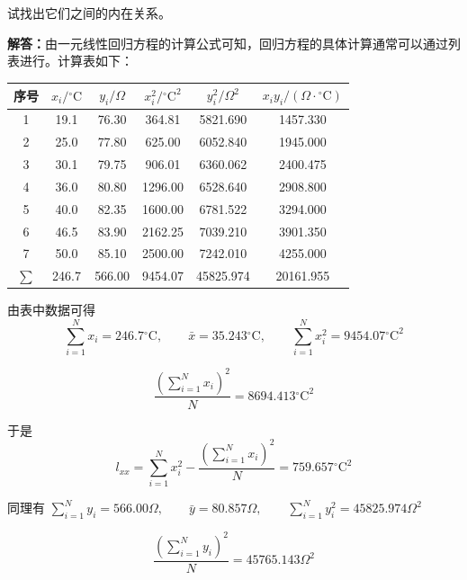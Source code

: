 \documentclass[UTF8,zihao=-4]{ctexart}
\newcommand{\jieda}{\noindent\textbf{解答：}}
\begin{document}
试找出它们之间的内在关系。

\jieda 由一元线性回归方程的计算公式可知，回归方程的具体计算通常可以通过列表进行。计算表如下：

\begin{center}
\small
\setlength{\tabcolsep}{4.5pt}
\begin{tabular}{c|c|c|c|c|c}
\toprule
序号 & $x_i/{}^\circ\mathrm{C}$ & $y_i/\Omega$ & $x_i^2/{}^\circ\mathrm{C}^2$ & $y_i^2/\Omega^2$ & $x_i y_i/(\Omega\cdot{}^\circ\mathrm{C})$\\
\midrule
1 & 19.1 & 76.30 & 364.81 & 5821.690 & 1457.330\\
2 & 25.0 & 77.80 & 625.00 & 6052.840 & 1945.000\\
3 & 30.1 & 79.75 & 906.01 & 6360.062 & 2400.475\\
4 & 36.0 & 80.80 & 1296.00 & 6528.640 & 2908.800\\
5 & 40.0 & 82.35 & 1600.00 & 6781.522 & 3294.000\\
6 & 46.5 & 83.90 & 2162.25 & 7039.210 & 3901.350\\
7 & 50.0 & 85.10 & 2500.00 & 7242.010 & 4255.000\\
\midrule
$\sum$ & 246.7 & 566.00 & 9454.07 & 45825.974 & 20161.955\\
\bottomrule
\end{tabular}
\end{center}

由表中数据可得
\begin{equation*}
    \sum_{i=1}^{N}x_i=246.7{}^\circ\mathrm{C}, \qquad \bar{x}=35.243{}^\circ\mathrm{C}, \qquad \sum_{i=1}^{N}x_i^2=9454.07{}^\circ\mathrm{C}^2
\end{equation*}

\begin{equation*}
    \frac{\left(\displaystyle\sum_{i=1}^{N}x_i\right)^2}{N} = 8694.413{}^\circ\mathrm{C}^2
\end{equation*}

于是
\begin{equation*}
    l_{xx} = \sum_{i=1}^{N}x_i^2 - \frac{\left(\displaystyle\sum_{i=1}^{N}x_i\right)^2}{N} = 759.657{}^\circ\mathrm{C}^2
\end{equation*}

同理有 $\sum_{i=1}^{N}y_i=566.00\Omega, \qquad \bar{y}=80.857\Omega, \qquad \sum_{i=1}^{N}y_i^2=45825.974\Omega^2$

\begin{equation*}
    \frac{\left(\displaystyle\sum_{i=1}^{N}y_i\right)^2}{N} = 45765.143\Omega^2
\end{equation*}
\end{document}
